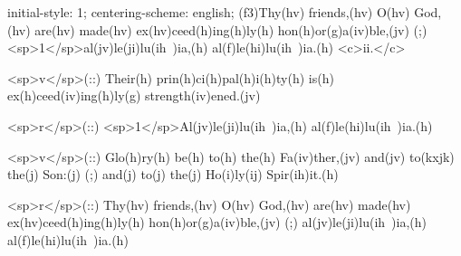 initial-style: 1;
centering-scheme: english;
(f3)Thy(hv) friends,(hv) O(hv) God,(hv) are(hv) made(hv) ex(hv)ceed(h)ing(h)ly(h) hon(h)or(g)a(iv)ble,(jv) (;) <sp>1</sp>al(jv)le(ji)lu(ih~)ia,(h) al(f)le(hi)lu(ih~)ia.(h) <c>ii.</c>

<sp>v</sp>(::) Their(h) prin(h)ci(h)pal(h)i(h)ty(h) is(h) ex(h)ceed(iv)ing(h)ly(g) strength(iv)ened.(jv)

<sp>r</sp>(::) <sp>1</sp>Al(jv)le(ji)lu(ih~)ia,(h) al(f)le(hi)lu(ih~)ia.(h)

<sp>v</sp>(::) Glo(h)ry(h) be(h) to(h) the(h) Fa(iv)ther,(jv) and(jv) to(kxjk) the(j) Son:(j) (;) and(j) to(j) the(j) Ho(i)ly(ij) Spir(ih)it.(h)

<sp>r</sp>(::) Thy(hv) friends,(hv) O(hv) God,(hv) are(hv) made(hv) ex(hv)ceed(h)ing(h)ly(h) hon(h)or(g)a(iv)ble,(jv) (;) al(jv)le(ji)lu(ih~)ia,(h) al(f)le(hi)lu(ih~)ia.(h)